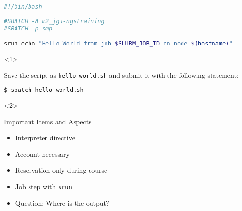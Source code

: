 \begin{frame}[fragile]
	\setcounter{handson}{\value{preframe_handson}}
	\frametitle{}
	\vspace{-2em}
	\begin{minipage}[t][0.32\textheight][t]{1.0\linewidth}
		\begin{lstlisting}[language=Bash, style=Shell, basicstyle=\scriptsize]
#!/bin/bash
			
#SBATCH -A m2_jgu-ngstraining
#SBATCH -p smp

srun echo "Hello World from job $SLURM_JOB_ID on node $(hostname)"
		\end{lstlisting}
	\end{minipage}\newline
	\begin{minipage}[t][0.3\textheight][t]{1.0\linewidth}
		\begin{onlyenv}<1>
			\begin{task}
				Save the script as \texttt{hello\_world.sh} and submit it with the following statement:
			\end{task}
			\begin{lstlisting}[language=Bash, style=Shell, basicstyle=\footnotesize]
				$ sbatch hello_world.sh
			\end{lstlisting}
		\end{onlyenv}
		\begin{onlyenv}<2>
			\begin{block}{Important Items and Aspects}
				\begin{itemize}
					\item Interpreter directive
					\item Account necessary
					\item Reservation only during course
					\item Job step with \texttt{srun}
					\item Question: Where is the output?
				\end{itemize}
			\end{block}
		\end{onlyenv}
	\end{minipage}
	\vfill
\end{frame}